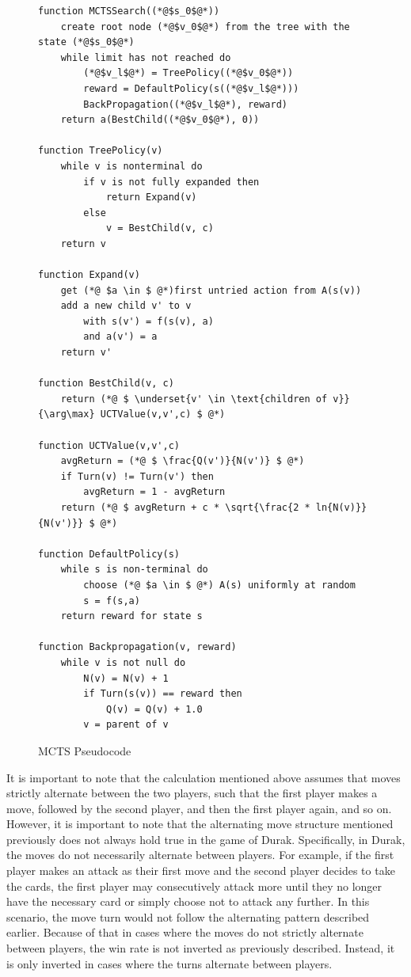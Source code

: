 \begin{figure}
\captionsetup{justification=centering}
\begin{lstlisting}
function MCTSSearch((*@$s_0$@*))
    create root node (*@$v_0$@*) from the tree with the state (*@$s_0$@*)
    while limit has not reached do
        (*@$v_l$@*) = TreePolicy((*@$v_0$@*))
        reward = DefaultPolicy(s((*@$v_l$@*)))
        BackPropagation((*@$v_l$@*), reward)
    return a(BestChild((*@$v_0$@*), 0))
	
function TreePolicy(v)
    while v is nonterminal do 
        if v is not fully expanded then
            return Expand(v)
        else
            v = BestChild(v, c)
    return v

function Expand(v)
    get (*@ $a \in $ @*)first untried action from A(s(v))
    add a new child v' to v
        with s(v') = f(s(v), a) 
        and a(v') = a
    return v'
	
function BestChild(v, c)
    return (*@ $ \underset{v' \in \text{children of v}}{\arg\max} UCTValue(v,v',c) $ @*)
	
function UCTValue(v,v',c)
    avgReturn = (*@ $ \frac{Q(v')}{N(v')} $ @*)
    if Turn(v) != Turn(v') then 
        avgReturn = 1 - avgReturn
    return (*@ $ avgReturn + c * \sqrt{\frac{2 * ln{N(v)}}{N(v')}} $ @*)
	
function DefaultPolicy(s)
    while s is non-terminal do
        choose (*@ $a \in $ @*) A(s) uniformly at random
        s = f(s,a)
    return reward for state s

function Backpropagation(v, reward)
    while v is not null do
        N(v) = N(v) + 1
        if Turn(s(v)) == reward then
            Q(v) = Q(v) + 1.0
        v = parent of v
\end{lstlisting}
\caption{MCTS Pseudocode}
\label{fig:mctsREST}
\end{figure}


It is important to note that the calculation mentioned above assumes that moves strictly alternate between the two players, such that the first player makes a move, followed by the second player, and then the first player again, and so on. However, it is important to note that the alternating move structure mentioned previously does not always hold true in the game of Durak. Specifically, in Durak, the moves do not necessarily alternate between players. For example, if the first player makes an attack as their first move and the second player decides to take the cards, the first player may consecutively attack more until they no longer have the necessary card or simply choose not to attack any further. In this scenario, the move turn would not follow the alternating pattern described earlier. Because of that in cases where the moves do not strictly alternate between players, the win rate is not inverted as previously described. Instead, it is only inverted in cases where the turns alternate between players.

